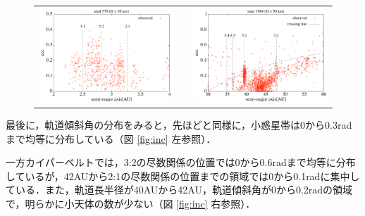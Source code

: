 \documentclass[11pt,a4paper,oneside,onecolumn]{jreport}
\begin{document}
\begin{figure}[H]
\begin{tabular}{ccc}
\begin{minipage}[t]{0.45\hsize}
\centering
\includegraphics[width=8cm]{./image/mainbelt_ecc.pdf}
\end{minipage} &
\begin{minipage}[t]{0.1\hsize}
\end{minipage} &
\begin{minipage}[t]{0.45\hsize}
\centering
\includegraphics[width=8cm]{./image/kuiperbelt_ecc.pdf}
\end{minipage}\\
%
\end{tabular}
\caption{\label{fig:ecc}}
\end{figure}

最後に，軌道傾斜角の分布をみると，先ほどと同様に，小惑星帯は0から0.3radまで均等に分布している（図 \ref{fig:inc} 左参照）．

一方カイパーベルトでは，3:2の尽数関係の位置では0から0.6radまで均等に分布しているが，42AUから2:1の尽数関係の位置までの領域では0から0.1radに集中している．また，軌道長半径が40AUから42AU，軌道傾斜角が0から0.2radの領域で，明らかに小天体の数が少ない（図 \ref{fig:inc} 右参照）．
\end{document}
